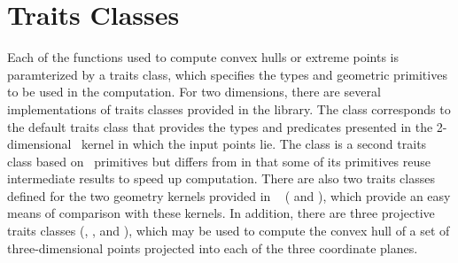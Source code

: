 \section{Traits Classes}

Each of the functions used to compute convex hulls or extreme points
is paramterized by a traits class, which specifies the types and geometric
primitives to be used in the computation.  For two dimensions, there are 
several implementations of traits classes provided in the library.  The class
corresponds to the default traits class that provides the types and 
predicates presented in the 2-dimensional \cgal\ kernel in which the input 
points lie.  The class 
is a second traits class based on \cgal\ primitives but differs from
 in that some of its primitives reuse
intermediate results to speed up computation.
There are also two traits classes defined for the two geometry kernels
provided in \leda\ \cite{mn-l-99} 
(
and 
), which provide an easy means of comparison with these kernels.
In addition, there are three projective traits classes 
(, 
, and 
), %
%
%
%
which may be used to compute the convex hull of a set of three-dimensional
points projected into each of the three coordinate planes.



